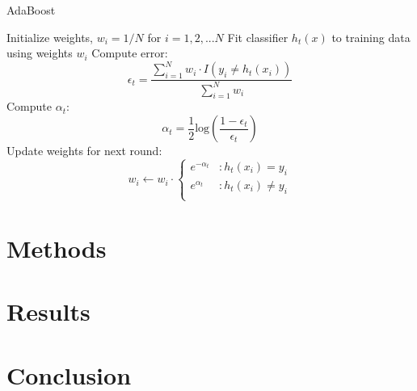 \documentclass[10pt]{article}
\begin{document}




\begin{algorithm}
\caption{AdaBoost}\label{adaboost}
\begin{algorithmic}[1]

		\State Initialize weights, $w_i = 1/N$ for $i = 1, 2, ... N$
			\State Fit classifier $h_t(x)$ to training data using weights $w_i$
			\State Compute error: 
				\State $$\epsilon_t = \frac{\sum_{i=1}^{N} w_i \cdot I(y_i \ne h_t(x_i))}{\sum_{i = 1}^{N} w_i}$$
			\State Compute $\alpha_t$:
				\State $$\alpha_t = \frac{1}{2} \text{log} \left(\frac{1 - \epsilon_t}{\epsilon_t} \right)$$
			\State Update weights for next round:
				\State \[ w_i \gets w_i \cdot \left\{ \begin{array}{lr}
				                                                        e^{-\alpha_t} & : h_t(x_i) = y_i \\
				                                                        e^{\alpha_t} & : h_t(x_i) \ne y_i \\
				                                                      \end{array}
				                                            \right.
				          \]
		\EndFor
	\EndProcedure
\end{algorithmic}
\end{algorithm}

\section{Methods}

\section{Results}

\section{Conclusion}


\newpage 



\end{document}
